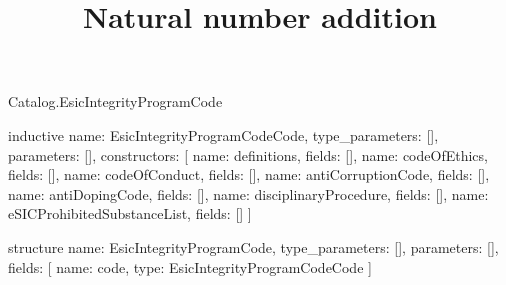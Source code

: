 \begin{lexlean}{Catalog.EsicIntegrityProgramCode}
\title{Natural number addition}
\begin{semanticmodule}
inductive{
  name: EsicIntegrityProgramCodeCode,
  type_parameters: [],
  parameters: [],
  constructors: [
    {name: definitions, fields: []},
    {name: codeOfEthics, fields: []},
    {name: codeOfConduct, fields: []},
    {name: antiCorruptionCode, fields: []},
    {name: antiDopingCode, fields: []},
    {name: disciplinaryProcedure, fields: []},
    {name: eSICProhibitedSubstanceList, fields: []}
  ]
}

structure{
  name: EsicIntegrityProgramCode,
  type_parameters: [],
  parameters: [],
  fields: [
    {name: code, type: EsicIntegrityProgramCodeCode}
  ]
}
\end{semanticmodule}
\end{lexlean}
